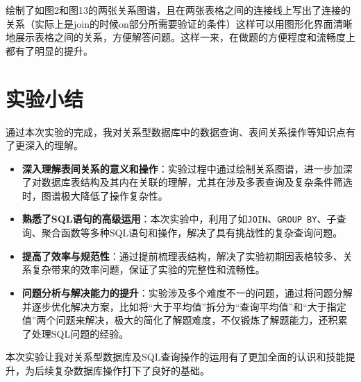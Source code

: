 \documentclass{article}
\begin{document}
    绘制了如图2和图13的两张关系图谱，且在两张表格之间的连接线上写出了连接的关系（实际上是join的时候on部分所需要验证的条件）这样可以用图形化界面清晰地展示表格之间的关系，方便解答问题。这样一来，在做题的方便程度和流畅度上都有了明显的提升。
    
    \section{实验小结}
    
    通过本次实验的完成，我对关系型数据库中的数据查询、表间关系操作等知识点有了更深入的理解。
    
    \begin{itemize} 
    	\item \textbf{深入理解表间关系的意义和操作}：实验过程中通过绘制关系图谱，进一步加深了对数据库表结构及其内在关联的理解，尤其在涉及多表查询及复杂条件筛选时，图谱极大降低了操作复杂性。
    	
    	\item \textbf{熟悉了SQL语句的高级运用}：本次实验中，利用了如\texttt{JOIN}、\texttt{GROUP BY}、子查询、聚合函数等多种SQL语句和操作，解决了具有挑战性的复杂查询问题。
    	
    	\item \textbf{提高了效率与规范性}：通过提前梳理表结构，解决了实验初期因表格较多、关系复杂带来的效率问题，保证了实验的完整性和流畅性。
    	
    	\item \textbf{问题分析与解决能力的提升}：实验涉及多个难度不一的问题，通过将问题分解并逐步优化解决方案，比如将“大于平均值”拆分为“查询平均值”和“大于指定值”两个问题来解决，极大的简化了解题难度，不仅锻炼了解题能力，还积累了处理SQL问题的经验。
    \end{itemize}
    
    本次实验让我对关系型数据库及SQL查询操作的运用有了更加全面的认识和技能提升，为后续复杂数据库操作打下了良好的基础。
\end{document}
